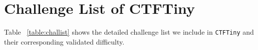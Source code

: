 \section{Challenge List of CTFTiny}

Table ~\ref{table:challist} shows the detailed challenge list we include in \texttt{CTFTiny} and their corresponding validated difficulty.

